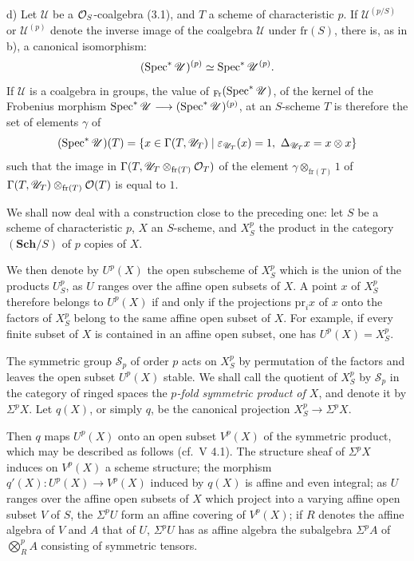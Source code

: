 \noindent d) Let $\mathscr U$ be a $\mathcal{O}_S$-coalgebra (3.1), and $T$ a scheme of characteristic $p$. If $\mathscr U^{(p/S)}$ or $\mathscr U^{(p)}$ denote the inverse image of the coalgebra $\mathscr U$ under $\mathrm{fr}(S)$, there is, as in b), a canonical isomorphism:
\[
(\operatorname{Spec}^*\mathscr U)^{(p)}\simeq\operatorname{Spec}^*\mathscr U^{(p)}.
\]
If $\mathscr U$ is a coalgebra in groups, the value of ${}_{\mathrm{Fr}}(\operatorname{Spec}^*\mathscr U)$, \ie of the kernel of the Frobenius morphism $\operatorname{Spec}^*\mathscr U\longrightarrow(\operatorname{Spec}^*\mathscr U)^{(p)}$, at an $S$-scheme $T$ is therefore the set of elements $\gamma$ of
\[
(\Spec^*\mathscr U)(T)=\{x\in\Gamma(T,\mathscr U_T)\mid\varepsilon_{\mathscr U_T}(x)=1,\ \Delta_{\mathscr U_T}x=x\otimes x\}
\]
such that the image in $\Gamma(T,\mathscr U_T\otimes_{\mathrm{fr}(T)}\mathcal{O}_T)$ of the element $\gamma\otimes_{\mathrm{fr}(T)}1$ of $\Gamma(T,\mathscr U_T)\otimes_{\mathrm{fr}(T)}\mathcal{O}(T)$ is equal to $1$.

We shall now deal with a construction close to the preceding one: let $S$ be a scheme of characteristic $p$, $X$ an $S$-scheme, and $X_S^p$ the product in the category $(\mathbf{Sch}/S)$ of $p$ copies of $X$.

We then denote by $U^p(X)$ the open subscheme of $X_S^p$ which is the union of the products $U_S^p$, as $U$ ranges over the affine open subsets of $X$. A point $x$ of $X_S^p$ therefore belongs to $U^p(X)$ if and only if the projections $\mathrm{pr}_ix$ of $x$ onto the factors of $X_S^p$ belong to the same affine open subset of $X$. For example, if every finite subset of $X$ is contained in an affine open subset, one has $U^p(X)=X_S^p$.

The symmetric group $\mathscr S_p$ of order $p$ acts on $X_S^p$ by permutation of the factors and leaves the open subset $U^p(X)$ stable. We shall call the quotient of $X_S^p$ by $\mathscr S_p$ in the category of ringed spaces the \emph{$p$-fold symmetric product of $X$}, and denote it by $\Sigma^pX$. Let $q(X)$, or simply $q$, be the canonical projection $X_S^p\to\Sigma^pX$.

Then $q$ maps $U^p(X)$ onto an open subset $V^p(X)$ of the symmetric product, which may be described as follows (cf.\ V 4.1). The structure sheaf of $\Sigma^pX$ induces on $V^p(X)$ a scheme structure; the morphism $q'(X):U^p(X)\to V^p(X)$ induced by $q(X)$ is affine and even integral; as $U$ ranges over the affine open subsets of $X$ which project into a varying affine open subset $V$ of $S$, the $\Sigma^pU$ form an affine covering of $V^p(X)$; if $R$ denotes the affine algebra of $V$ and $A$ that of $U$, $\Sigma^pU$ has as affine algebra the subalgebra $\Sigma^pA$ of $\bigotimes_R^pA$ consisting of symmetric tensors.

